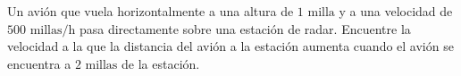 \item Un avión que vuela horizontalmente a una altura de $1 \text{ milla}$ y a una velocidad de $500 \text{ millas/h}$ pasa directamente sobre una estación de radar. Encuentre la velocidad a la que la distancia del avión a la estación aumenta cuando el avión se encuentra a $2 \text{ millas}$ de la estación.

